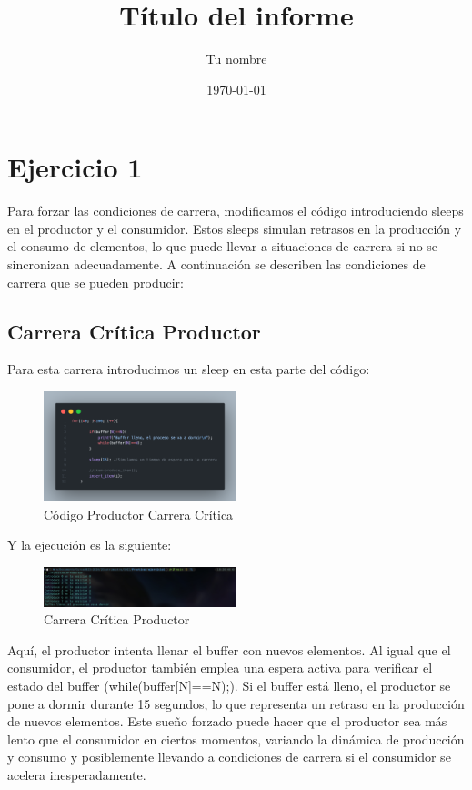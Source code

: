 \documentclass[twocolumn]{article}
\title{Título del informe}
\author{Tu nombre}
\date{\today}
\begin{document}
\maketitle

\section{Ejercicio 1}

Para forzar las condiciones de carrera, modificamos el código introduciendo sleeps en el productor y el consumidor. Estos sleeps simulan retrasos en la producción y el consumo de elementos, lo que puede llevar a situaciones de carrera si no se sincronizan adecuadamente. A continuación se describen las condiciones de carrera que se pueden producir:

\subsection{Carrera Crítica Productor}

Para esta carrera introducimos un sleep en esta parte del código:

\begin{figure}[H]
    \centering
    \includegraphics[width=0.5\textwidth]{ejercicio1/productorSleep.png}
    \caption{Código Productor Carrera Crítica} 
    \label{fig:my_label}
\end{figure}

Y la ejecución es la siguiente:

\begin{figure}[H]
    \centering
    \includegraphics[width=0.5\textwidth]{ejercicio1/productorCarrera.jpg}
    \caption{Carrera Crítica Productor} 
    \label{fig:my_label}
\end{figure}

Aquí, el productor intenta llenar el buffer con nuevos elementos.  Al igual que el consumidor, el productor también emplea una espera activa para verificar el estado del buffer (while(buffer[N]==N);). Si el buffer está lleno, el productor se pone a dormir durante 15 segundos, lo que representa un retraso en la producción de nuevos elementos. Este sueño forzado puede hacer que el productor sea más lento que el consumidor en ciertos momentos, variando la dinámica de producción y consumo y posiblemente llevando a condiciones de carrera si el consumidor se acelera inesperadamente.
\end{document}

